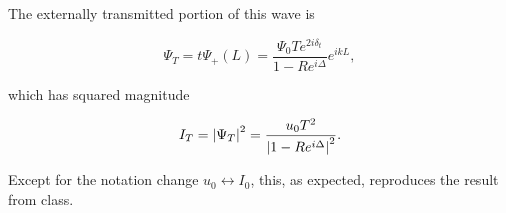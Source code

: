 {The externally transmitted portion of this wave is

\begin{dmath}\label{eqn:modernOptics:problemSet3:2:400}
\Psi_T
=
t \Psi_{+}(L)
=
\frac{\Psi_0 T e^{2 i \delta_t} }{1 - R e^{ i \Delta} }
e^{i k L},
\end{dmath}

which has squared magnitude

\begin{dmath}\label{eqn:modernOptics:problemSet3:2:420}
I_T
= \Abs{\Psi_T}^2
= \frac{u_0 T^2}{\Abs{1 - R e^{i \Delta}}^2}.
\end{dmath}

Except for the notation change $u_0 \leftrightarrow I_0$, this, as expected, reproduces the result from class.

} %
